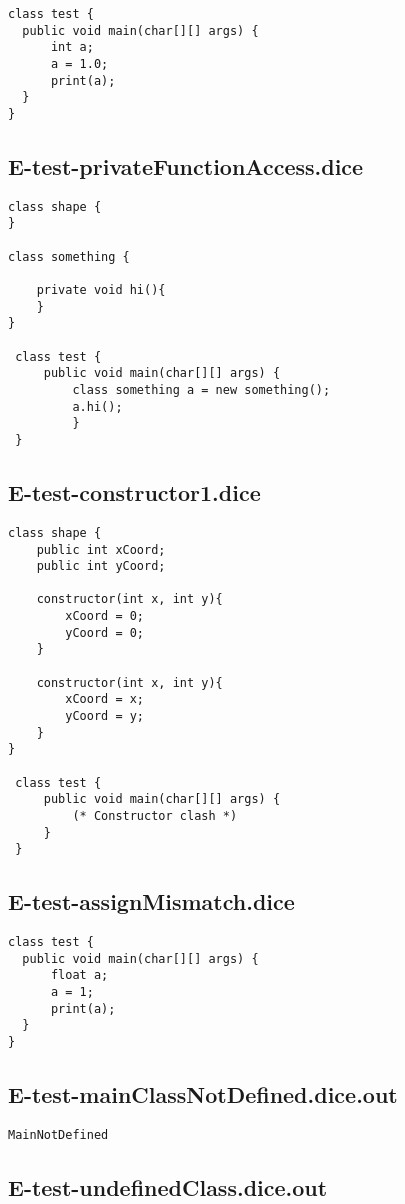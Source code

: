\begin{verbatim}
class test {
  public void main(char[][] args) {
      int a;
      a = 1.0;
      print(a);
  }
}
\end{verbatim}\pagebreak\subsection{E-test-privateFunctionAccess.dice}
\begin{verbatim}
class shape {
}

class something {
	
	private void hi(){
	}
}

 class test {
	 public void main(char[][] args) {
		 class something a = new something();
		 a.hi();		 
		 }
 }
\end{verbatim}\pagebreak\subsection{E-test-constructor1.dice}
\begin{verbatim}
class shape {
	public int xCoord;
	public int yCoord;
	
	constructor(int x, int y){
		xCoord = 0;
		yCoord = 0;
	}

	constructor(int x, int y){
		xCoord = x;
		yCoord = y;
	}
}

 class test {
	 public void main(char[][] args) {
		 (* Constructor clash *)
	 }
 }
\end{verbatim}\pagebreak\subsection{E-test-assignMismatch.dice}
\begin{verbatim}
class test {
  public void main(char[][] args) {
      float a;
      a = 1;
      print(a);
  }
}
\end{verbatim}\pagebreak\subsection{E-test-mainClassNotDefined.dice.out}
\begin{verbatim}
MainNotDefined 

\end{verbatim}\pagebreak\subsection{E-test-undefinedClass.dice.out}
